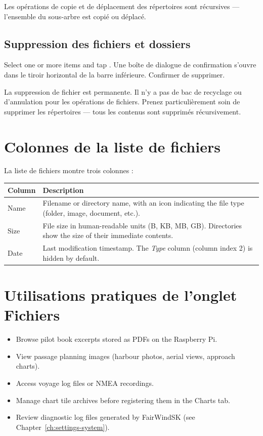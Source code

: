 Les opérations de copie et de déplacement des répertoires sont récursives --- l'ensemble du sous-arbre est copié ou déplacé.

\subsection{Suppression des fichiers et dossiers}

Select one or more items and tap .
Une boîte de dialogue de confirmation s'ouvre dans le tiroir horizontal de la barre inférieure.
Confirmer de supprimer.

\begin{warningbox}
La suppression de fichier est permanente.
Il n'y a pas de bac de recyclage ou d'annulation pour les opérations de fichiers.
Prenez particulièrement soin de supprimer les répertoires --- tous les contenus sont supprimés récursivement.
\end{warningbox}

\section{Colonnes de la liste de fichiers}

La liste de fichiers montre trois colonnes :

\begin{longtable}{L{2cm} L{11.7cm}}
\toprule
{}
{\sffamily\bfseries\color{white} Column} &
{\sffamily\bfseries\color{white} Description} \\
\midrule
Name & Filename or directory name, with an icon indicating the file type (folder, image, document, etc.). \\
Size & File size in human-readable units (B, KB, MB, GB). Directories show the size of their immediate contents. \\
Date & Last modification timestamp. The \textit{Type} column (column index 2) is hidden by default. \\
\bottomrule
\end{longtable}

\section{Utilisations pratiques de l'onglet Fichiers}

\begin{itemize}
  \item Browse pilot book excerpts stored as PDFs on the Raspberry Pi.
  \item View passage planning images (harbour photos, aerial views, approach charts).
  \item Access voyage log files or NMEA recordings.
  \item Manage chart tile archives before registering them in the Charts tab.
  \item Review diagnostic log files generated by FairWindSK (see Chapter~\ref{ch:settings-system}).
\end{itemize}
